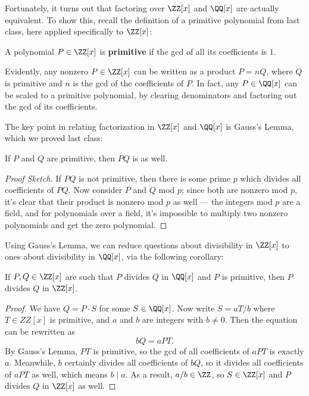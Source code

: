 Fortunately, it turns out that factoring over $\ZZ[x]$ and $\QQ[x]$ are actually equivalent. To show this, recall the definition of a primitive polynomial from last class, here applied specifically to $\ZZ[x]$:

\begin{definition}
A polynomial $P \in \ZZ[x]$ is \textbf{primitive} if the gcd of all its coefficients is $1$. 
\end{definition}

Evidently, any nonzero $P \in \ZZ[x]$ can be written as a product $P = nQ$, where $Q$ is primitive and $n$ is the gcd of the coefficients of $P$. In fact, any $P \in \QQ[x]$ can be scaled to a primitive polynomial, by clearing denominators and factoring out the gcd of its coefficients. 

The key point in relating factorization in $\ZZ[x]$ and $\QQ[x]$ is Gauss's Lemma, which we proved last class: 

\begin{lemma}
If $P$ and $Q$ are primitive, then $PQ$ is as well.
\end{lemma}

\begin{proof}[Proof Sketch]
If $PQ$ is not primitive, then there is some prime $p$ which divides all coefficients of $PQ$. Now consider $P$ and $Q$ mod $p$; since both are nonzero mod $p$, it's clear that their product is nonzero mod $p$ as well --- the integers mod $p$ are a field, and for polynomials over a field, it's impossible to multiply two nonzero polynomials and get the zero polynomial. 
\end{proof}

Using Gauss's Lemma, we can reduce questions about divisibility in $\ZZ[x]$ to ones about divisibility in $\QQ[x]$, via the following corollary:

\begin{corollary}\label{primitive}
If $P, Q \in \ZZ[x]$ are such that $P$ divides $Q$ in $\QQ[x]$ and $P$ is primitive, then $P$ divides $Q$ in $\ZZ[x]$.
\end{corollary}

\begin{proof}
We have $Q  = P\cdot S$ for some $S \in \QQ[x]$. Now write $S = aT/b$ where $T \in ZZ[x]$ is primitive, and $a$ and $b$ are integers with $b \neq 0$. Then the equation can be rewritten as \[bQ = aPT.\] By Gauss's Lemma, $PT$ is primitive, so the gcd of all coefficients of $aPT$ is exactly $a$. Meanwhile, $b$ certainly divides all coefficients of $bQ$, so it divides all coefficients of $aPT$ as well, which means $b \mid a$. As a result, $a/b \in \ZZ$, so $S \in \ZZ[x]$ and $P$ divides $Q$ in $\ZZ[x]$ as well.
\end{proof}

